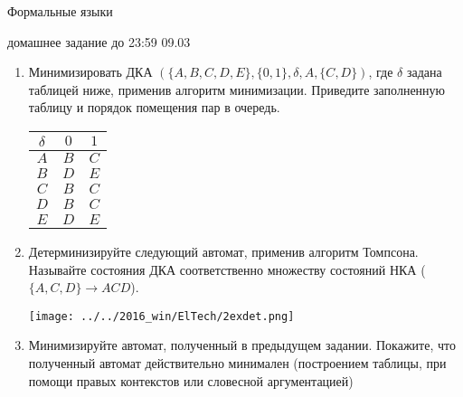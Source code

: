 \documentclass[12pt]{article}
\begin{document}
\begin{center}
  \LARGE Формальные языки 

  \Large домашнее задание до 23:59 09.03
\end{center}
\bigskip

\begin{enumerate}
  \item Минимизировать ДКА $(\{A, B, C, D, E\}, \{0, 1\}, \delta, A, \{ C, D \})$, где $\delta$ задана таблицей ниже, применив алгоритм минимизации. Приведите заполненную таблицу и порядок помещения пар в очередь.
  \begin{center} 
\begin{tabular}{c|c|c}
$\delta$ & $0$ & $1$ \\ \hline
$A$ & $B$ & $C$ \\
$B$ & $D$ & $E$ \\
$C$ & $B$ & $C$ \\
$D$ & $B$ & $C$ \\
$E$ & $D$ & $E$ \\
\end{tabular}
\end{center}
    \item Детерминизируйте следующий автомат, применив алгоритм Томпсона. Называйте состояния ДКА соответственно множеству состояний НКА ($\{ A, C, D \} \rightarrow ACD $).
    
        \begin{center} \texttt{[image: ../../2016\_win/ElTech/2exdet.png]} \end{center}
    \item Минимизируйте автомат, полученный в предыдущем задании. Покажите, что полученный автомат действительно минимален (построением таблицы, при помощи правых контекстов или словесной аргументацией)
\end{enumerate}  


\end{document}
